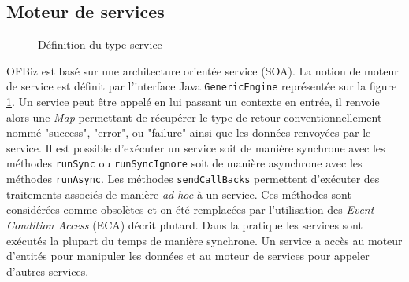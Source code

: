 \documentclass[a4paper, 11pt]{report}
\begin{document}
\subsection{Moteur de services}

\begin{figure}
  \centering
  \caption{Définition du type service}
  \label{fig:serviceengine}
\end{figure}

OFBiz est basé sur une architecture orientée service (SOA). La notion
de moteur de service est définit par l'interface Java
\verb=GenericEngine= représentée sur la figure
\ref{fig:serviceengine}.  Un service peut être appelé en lui passant
un contexte en entrée, il renvoie alors une \emph{Map} permettant de
récupérer le type de retour conventionnellement nommé "success",
"error", ou "failure" ainsi que les données renvoyées par le
service. Il est possible d'exécuter un service soit de manière
synchrone avec les méthodes \verb=runSync= ou \verb=runSyncIgnore=
soit de manière asynchrone avec les méthodes \verb=runAsync=. Les
méthodes \verb=sendCallBacks= permettent d'exécuter des traitements
associés de manière \emph{ad hoc} à un service. Ces méthodes sont
considérées comme obsolètes et on été remplacées par l'utilisation des
\emph{Event Condition Access} (ECA) décrit plutard. Dans la pratique
les services sont exécutés la plupart du temps de manière
synchrone. Un service a accès au moteur d'entités pour manipuler les
données et au moteur de services pour appeler d'autres services.
\end{document}
